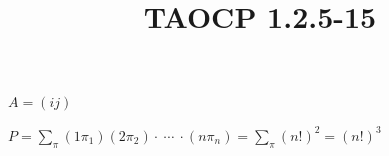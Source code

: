 \documentclass{article}
\title{TAOCP 1.2.5\mbox{-}15}
\begin{document}
\maketitle

\( A = (ij) \)

\( P = \sum_{\pi} (1\pi_{1})(2\pi_{2}) \cdot\ \cdots\ \cdot (n\pi_{n}) = \sum_{\pi} {(n!)}^{2} = {(n!)}^{3} \)
\end{document}
